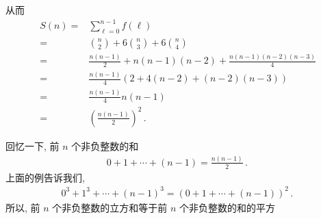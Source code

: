 \begin{example}
    从而
    \begin{align*}
        S(n)
        = {} & \sum_{\ell = 0}^{n - 1} f(\ell)                             \\
        = {} & \binom{n}{2} + 6 \binom{n}{3} + 6 \binom{n}{4}              \\
        = {} & \frac{n(n-1)}{2} + n(n-1)(n-2) + \frac{n(n-1)(n-2)(n-3)}{4} \\
        = {} & \frac{n(n-1)}{4} (2 + 4(n-2) + (n-2)(n-3))                  \\
        = {} & \frac{n(n-1)}{4} n(n-1)                                     \\
        = {} & \left( \frac{n(n-1)}{2} \right)^2 \period
    \end{align*}
\end{example}

\begin{remark}
    回忆一下, 前 $n$ 个非负整数的和
    \begin{align*}
        0 + 1 + \cdots + (n - 1) = \frac{n(n-1)}{2} \period
    \end{align*}
    上面的例告诉我们,
    \begin{align*}
        0^3 + 1^3 + \cdots + (n - 1)^3 = (0 + 1 + \cdots + (n - 1))^2 \period
    \end{align*}
    所以, 前 $n$ 个非负整数的立方和等于前 $n$ 个非负整数的和的平方\period
\end{remark}

